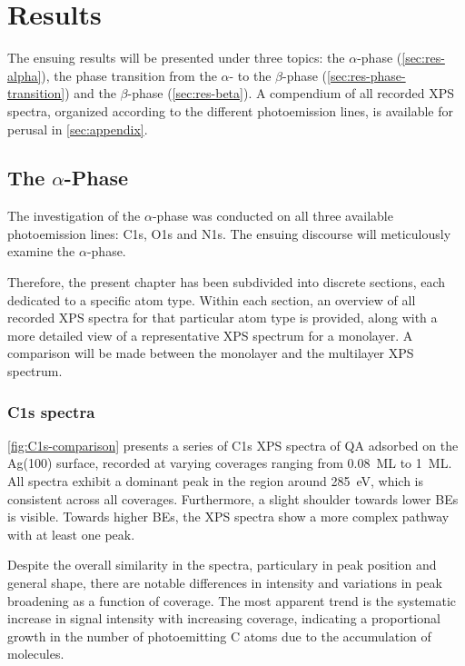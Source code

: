\chapter{Results}
\label{sec:results}
\raggedbottom

The ensuing results will be presented under three topics: the $\alpha$-phase (\autoref{sec:res-alpha}), the phase transition from the $\alpha$- to the $\beta$-phase (\autoref{sec:res-phase-transition}) and the $\beta$-phase (\autoref{sec:res-beta}). A compendium of all recorded \ac{XPS} spectra, organized according to the different photoemission lines, is available for perusal in \autoref{sec:appendix}.

\section{The \texorpdfstring{$\alpha$}{alpha}-Phase}
\label{sec:res-alpha}

The investigation of the $\alpha$-phase was conducted on all three available photoemission lines: C1s, O1s and N1s. The ensuing discourse will meticulously examine the $\alpha$-phase.

Therefore, the present chapter has been subdivided into discrete sections, each dedicated to a specific atom type. Within each section, an overview of all recorded \ac{XPS} spectra for that particular atom type is provided, along with a more detailed view of a representative \ac{XPS} spectrum for a monolayer. A comparison will be made between the monolayer and the multilayer \ac{XPS} spectrum.

\clearpage
\subsection{C1s spectra}
\label{sec:C1s-alpha}

\autoref{fig:C1s-comparison} presents a series of C1s \ac{XPS} spectra of \ac{QA} adsorbed on the Ag(100) surface, recorded at varying coverages ranging from 0.08~\ac{ML} to 1~\ac{ML}. All spectra exhibit a dominant peak in the region around 285~\si{\eV}, which is consistent across all coverages. Furthermore, a slight shoulder towards lower \acp{BE} is visible. Towards higher \acp{BE}, the \ac{XPS} spectra show a more complex pathway with at least one peak.

Despite the overall similarity in the spectra, particulary in peak position and general shape, there are notable differences in intensity and variations in peak broadening as a function of coverage. The most apparent trend is the systematic increase in signal intensity with increasing coverage, indicating a proportional growth in the number of photoemitting C atoms due to the accumulation of molecules.

